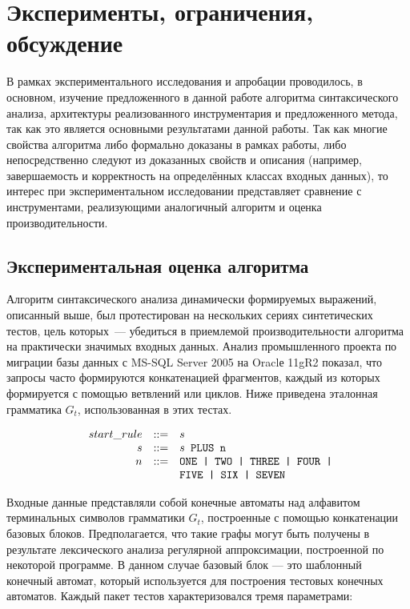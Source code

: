 \chapter{Эксперименты, ограничения, обсуждение} \label{chaptEval}

В рамках экспериментального исследования и апробации проводилось, в основном, изучение предложенного в данной работе алгоритма синтаксического анализа, архитектуры реализованного инструментария и предложенного метода, так как это является основными результатами данной работы. Так как многие свойства алгоритма либо формально доказаны в рамках работы, либо непосредственно следуют из доказанных свойств и описания (например, завершаемость и корректность на определённых классах входных данных), то интерес при экспериментальном исследовании представляет сравнение с инструментами, реализующими аналогичный алгоритм и оценка производительности.


\section{Экспериментальная оценка алгоритма}\label{SyntTestsEvalDescr}

Алгоритм синтаксического анализа динамически формируемых выражений, описанный выше, был протестирован на нескольких сериях синтетических тестов, цель которых~--- убедиться в приемлемой производительности алгоритма на практически значимых входных данных. Анализ промышленного проекта по миграции базы данных с MS-SQL Server 2005 на Oraclе 11gR2 показал, что запросы часто формируются конкатенацией фрагментов, каждый из которых формируется с помощью ветвлений или циклов. Ниже приведена эталонная грамматика $G_t$, использованная в этих тестах.

$$
\begin{array}{crcl}
& start\_rule &::=& s \\
& s & ::= & s \mbox{\texttt{ PLUS }} \mbox{\texttt{n}}\\
& n & ::= & \mbox{\texttt{ONE | }} \mbox{\texttt{TWO | }} \mbox{\texttt{THREE | }} \mbox{\texttt{FOUR | }} \\
&   &     & \mbox{\texttt{FIVE | }} \mbox{\texttt{SIX | }} \mbox{\texttt{SEVEN}}
\end{array}
$$

Входные данные представляли собой конечные автоматы над алфавитом терминальных символов грамматики $G_t$, построенные с помощью конкатенации базовых блоков. Предполагается, что такие графы могут быть получены в результате лексического анализа регулярной аппроксимации, построенной по некоторой программе. В данном случае базовый блок --- это шаблонный конечный автомат, который используется для построения тестовых конечных автоматов. Каждый пакет тестов характеризовался тремя параметрами: 

